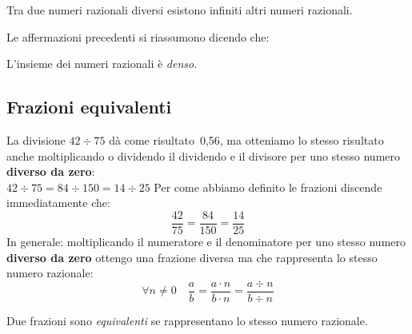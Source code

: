 \begin{corollario}{}{}
 Tra due numeri razionali diversi esistono infiniti altri numeri razionali.
\end{corollario}

Le affermazioni precedenti si riassumono dicendo che:

\begin{definizione}{}{}
 L'insieme dei numeri razionali è \emph{denso}.
\end{definizione}

\subsection{Frazioni equivalenti}
\label{sub:razionali_equivalenti}

La divisione \(42 \div 75 \) dà come risultato~0,56, ma otteniamo lo stesso 
risultato anche moltiplicando o dividendo il dividendo e il divisore per 
uno stesso numero \textbf{diverso da zero}:\\
\(42 \div 75 = 84 \div 150 = 14 \div 25\)
Per come abbiamo definito le frazioni discende immediatamente che:\\
\[\dfrac{42}{75} = \dfrac{84}{150} = \dfrac{14}{25}\]
In generale: moltiplicando il numeratore e il denominatore per uno stesso 
numero \textbf{diverso da zero} ottengo una frazione diversa ma che 
rappresenta lo stesso numero razionale:
\[\forall n \neq 0 \quad \frac{a}{b} = \frac{a \cdot n}{b \cdot n} =
  \frac{a \div n}{b \div n}\]

\begin{definizione}{}{}
 Due frazioni sono \emph{equivalenti} se rappresentano lo stesso numero 
razionale.
\end{definizione}

